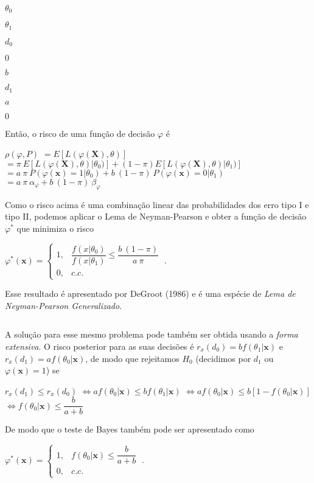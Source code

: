 \documentclass[
]{book}
\begin{document}
\(\theta_0\)

\(\theta_1\)

\(d_0\)

\(0\)

\(b\)

\(d_1\)

\(a\)

\(0\)

Então, o risco de uma função de decisão \(\varphi\) é

\(\rho(\varphi,P)\) \(=E\left[L(\varphi(\boldsymbol X),\theta)\right]\)
\(= \pi~E\left[L(\varphi(\boldsymbol X),\theta)\big|\theta_0)\right] + (1-\pi)E\left[L(\varphi(\boldsymbol X),\theta)\big|\theta_1)\right]\)
\(= a~\pi~P\left(\varphi(\boldsymbol x)=1\big|\theta_0\right) + b~(1-\pi)~P\left(\varphi(\boldsymbol x)=0\big|\theta_1\right)\)
\(= a~\pi~\alpha_\varphi + b~(1-\pi)~\beta_\varphi\)

Como o risco acima é uma combinação linear das probabilidades dos erro tipo I e tipo II, podemos aplicar o Lema de Neyman-Pearson e obter a função de decisão \(\varphi^*\) que minimiza o risco

\({\varphi}^*(\boldsymbol x)=\left\{\begin{array}{rl} 1,& \dfrac{f(x|\theta_0)}{f(x|\theta_1)}\leq \dfrac{b~(1-\pi)}{a~\pi}\\ 0,& c.c.\end{array}\right.~.\)

Esse resultado é apresentado por DeGroot (1986) e é uma espécie de \emph{Lema de Neyman-Pearson Generalizado}.

\(~\)

A solução para esse mesmo problema pode também ser obtida usando a \emph{forma extensiva}. O risco posterior para as suas decisões é \(r_x(d_0) = b f(\theta_1|\boldsymbol x)\) e \(r_x(d_1) = a f(\theta_0|\boldsymbol x)\), de modo que rejeitamos \(H_0\) (decidimos por \(d_1\) ou \(\varphi(\boldsymbol x)=1\)) se

\(r_x(d_1) \leq r_x(d_0)\)
\(\Longleftrightarrow a f(\theta_0|\boldsymbol x) \leq b f(\theta_1|\boldsymbol x)\)
\(\Longleftrightarrow a f(\theta_0|\boldsymbol x) \leq b \left[1-f(\theta_0|\boldsymbol x)\right]\)
\(\Longleftrightarrow f(\theta_0|\boldsymbol x) \leq \dfrac{b}{a+b}\)

De modo que o teste de Bayes também pode ser apresentado como

\({\varphi}^*(\boldsymbol x)=\left\{\begin{array}{rl} 1,& f(\theta_0|\boldsymbol x) \leq \dfrac{b}{a+b} \\ 0,& c.c.\end{array}\right.~.\)
\end{document}

